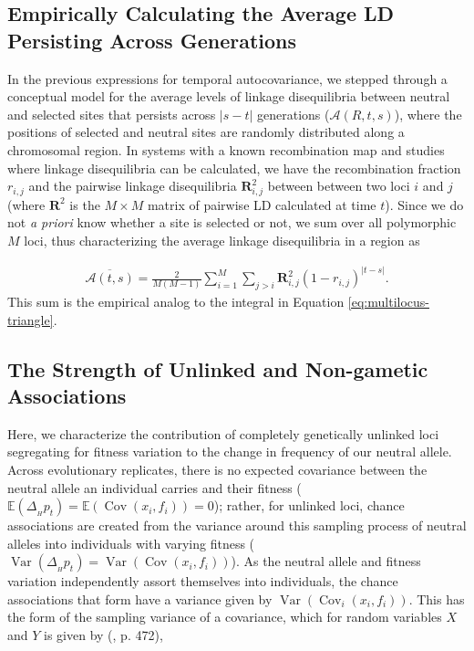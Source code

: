 \documentclass[11pt]{article}
\newcommand{\E}{\mathbb{E}}
\DeclareMathOperator{\var}{Var}
\DeclareMathOperator{\cov}{Cov}
\begin{document}
\subsection{Empirically Calculating the Average LD Persisting Across Generations}

In the previous expressions for temporal autocovariance, we stepped through a
conceptual model for the average levels of linkage disequilibria between
neutral and selected sites that persists across $|s-t|$ generations
($\mathcal{A}(R, t,s)$), where the positions of selected and neutral sites are
randomly distributed along a chromosomal region. In systems with a known
recombination map and studies where linkage disequilibria can be calculated, we
have the recombination fraction $r_{i,j}$ and the pairwise linkage
disequilibria $\mathbf{R}^2_{i,j}$ between between two loci $i$ and $j$ (where
$\mathbf{R}^2$ is the $M \times M$ matrix of pairwise LD calculated at time
$t$). Since we do not \emph{a priori} know whether a site is selected or not,
we sum over all polymorphic $M$ loci, thus characterizing the average
linkage disequilibria in a region as

\begin{align}
  \label{eq:supp-emp-assoc}
  \overline{\mathcal{A}(t, s)} = \frac{2}{M(M-1)} \sum_{i=1}^{M} \sum_{j > i} \mathbf{R}_{i,j}^2  (1-r_{i,j})^{|t-s|}.
\end{align}
%
This sum is the empirical analog to the integral in Equation
\eqref{eq:multilocus-triangle}.

\subsection{The Strength of Unlinked and Non-gametic Associations}
\label{ap:strength-assoc}

Here, we characterize the contribution of completely genetically unlinked loci
segregating for fitness variation to the change in frequency of our neutral
allele. Across evolutionary replicates, there is no expected covariance between
the neutral allele an individual carries and their fitness ($\E(\Delta_{_H}
p_t)= \E(\cov(x_i, f_i)) = 0$); rather, for unlinked loci, chance associations
are created from the variance around this sampling process of neutral alleles
into individuals with varying fitness ($\var(\Delta_{_H} p_t)= \var(\cov(x_i,
f_i))$). As the neutral allele and fitness variation independently assort
themselves into individuals, the chance associations that form have a variance
given by $\var(\cov_i(x_i, f_i))$.  This has the form of the sampling variance
of a covariance, which for random variables $X$ and $Y$ is given by
\citeauthor{Kendall1994-gp} (\citeyear{Kendall1994-gp}, p. 472),
\end{document}

